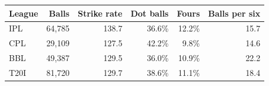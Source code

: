 \begin{tabular}{lrrrrr}
\toprule
League & Balls & Strike rate & Dot balls & Fours & Balls per six \\
\midrule
IPL & 64,785 & 138.7 & 36.6\% & 12.2\% & 15.7 \\
CPL & 29,109 & 127.5 & 42.2\% & 9.8\% & 14.6 \\
BBL & 49,387 & 129.5 & 36.0\% & 10.9\% & 22.2 \\
T20I & 81,720 & 129.7 & 38.6\% & 11.1\% & 18.4 \\
\bottomrule
\end{tabular}